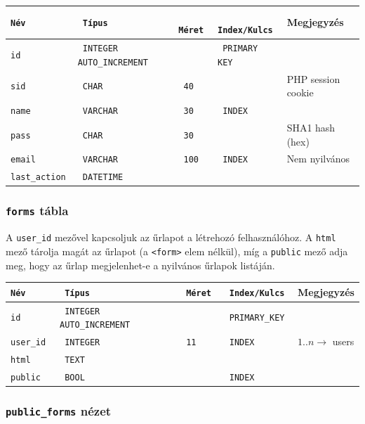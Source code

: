 \documentclass[12pt,a4paper,twoside]{article}
\begin{document}
\small
\vspace{.3cm}
\begin{tabular*}{\textwidth}{>{\tt}l>{\tt}l>{\tt}l>{\tt}l|l}
  \rm Név       &  \rm Típus  &  \rm Méret  & \rm Index/Kulcs & Megjegyzés           \\
  \hline
  id           &   INTEGER AUTO\_INCREMENT && PRIMARY KEY    &                      \\
  sid          &   CHAR      & 40          &                 &  PHP session cookie  \\
  name         &   VARCHAR   & 30          & INDEX           &                      \\
  pass         &   CHAR      & 30          &                 &  SHA1 hash (hex)     \\
  email        &   VARCHAR   & 100         & INDEX           &  Nem nyilvános       \\
  last\_action &   DATETIME  &             &                 &
\end{tabular*}
\normalsize

\subsubsection{\texttt{forms} tábla}

A \texttt{user\_id} mezővel kapcsoljuk az űrlapot a létrehozó felhasználóhoz. A
\texttt{html} mező tárolja magát az űrlapot (a \texttt{<form>} elem nélkül), míg
a \texttt{public} mező adja meg, hogy az űrlap megjelenhet-e a nyilvános űrlapok
listáján.

\small
\vspace{.3cm}
\begin{tabular*}{\textwidth}{>{\tt}l>{\tt}l>{\tt}l>{\tt}l|l}
  \rm Név    & \rm Típus &  \rm Méret  & \rm Index/Kulcs & Megjegyzés\\
  \hline
  id        & INTEGER AUTO\_INCREMENT && PRIMARY\_KEY   &                            \\
  user\_id  & INTEGER   & 11          & INDEX           & $1..n \rightarrow{}$ users \\
  html      & TEXT      &             &                 &                            \\
  public    & BOOL      &             & INDEX           &
\end{tabular*}
\normalsize

\clearpage

\subsubsection{\texttt{public\_forms} nézet}
\end{document}
